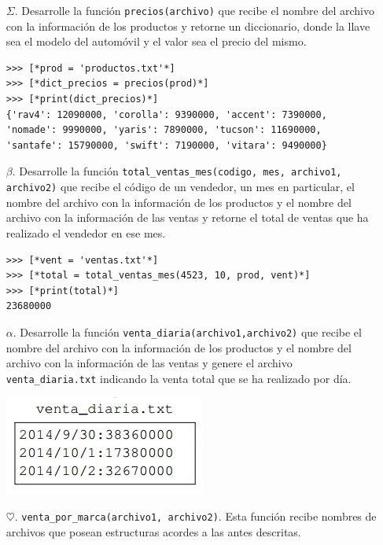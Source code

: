 \begin{itemize}
    \item[$\Sigma$.] Desarrolle la función \texttt{precios(archivo)} que recibe el nombre del archivo con la información de los productos y retorne un diccionario, donde la llave sea el modelo del automóvil y el valor sea el precio del mismo.
    
\begin{lstlisting}[style=consola]
>>> [*prod = 'productos.txt'*]
>>> [*dict_precios = precios(prod)*]
>>> [*print(dict_precios)*]
{'rav4': 12090000, 'corolla': 9390000, 'accent': 7390000, 
'nomade': 9990000, 'yaris': 7890000, 'tucson': 11690000, 
'santafe': 15790000, 'swift': 7190000, 'vitara': 9490000}
\end{lstlisting}

    \item[$\beta$.] Desarrolle la función \texttt{total\_ventas\_mes(codigo, mes, archivo1, archivo2)} que recibe el código de un vendedor, un mes en particular, el nombre del archivo con la información de los productos y el nombre del archivo con la información de las ventas y retorne el total de ventas que ha realizado el vendedor en ese mes.
    
\begin{lstlisting}[style=consola]
>>> [*vent = 'ventas.txt'*]
>>> [*total = total_ventas_mes(4523, 10, prod, vent)*]
>>> [*print(total)*]
23680000
\end{lstlisting}
    \item[$\alpha$.] Desarrolle la función \texttt{venta\_diaria(archivo1,archivo2)} que recibe el nombre del archivo con la información de los productos y el nombre del archivo con la información de las ventas y genere el archivo \texttt{venta\_diaria.txt} indicando la venta total que se ha realizado por día.


\begin{center}
\includegraphics[scale=0.7]{Imagenes/ventadiaria.png}
\end{center}

    \item[$\heartsuit$.] \texttt{venta\_por\_marca(archivo1, archivo2)}. Esta función recibe nombres de archivos que posean estructuras acordes a las antes descritas.
    

\end{itemize}
